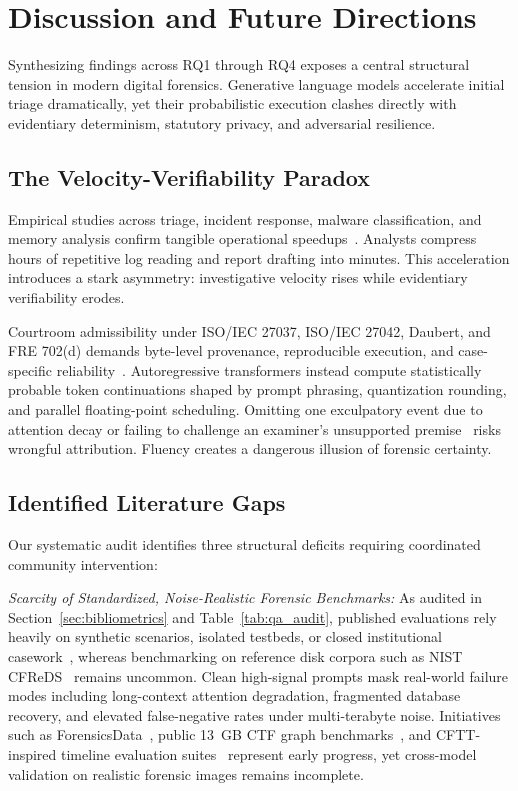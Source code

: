 \section{Discussion and Future Directions}
\label{sec:discussion}

Synthesizing findings across RQ1 through RQ4 exposes a central structural tension in modern digital forensics. Generative language models accelerate initial triage dramatically, yet their probabilistic execution clashes directly with evidentiary determinism, statutory privacy, and adversarial resilience.

\subsection{The Velocity-Verifiability Paradox}
Empirical studies across triage, incident response, malware classification, and memory analysis confirm tangible operational speedups~\cite{oh2024_volgpt, liu2025_autobnb, clark2025_large}. Analysts compress hours of repetitive log reading and report drafting into minutes. This acceleration introduces a stark asymmetry: investigative velocity rises while evidentiary verifiability erodes.

Courtroom admissibility under ISO/IEC 27037, ISO/IEC 27042, Daubert, and FRE 702(d) demands byte-level provenance, reproducible execution, and case-specific reliability~\cite{iso27037_2012, iso27042_2015, daubert1993, fre702_2023}. Autoregressive transformers instead compute statistically probable token continuations shaped by prompt phrasing, quantization rounding, and parallel floating-point scheduling. Omitting one exculpatory event due to attention decay or failing to challenge an examiner's unsupported premise~\cite{trivedi2026_when} risks wrongful attribution. Fluency creates a dangerous illusion of forensic certainty.

\subsection{Identified Literature Gaps}
Our systematic audit identifies three structural deficits requiring coordinated community intervention:

\textit{Scarcity of Standardized, Noise-Realistic Forensic Benchmarks:} As audited in Section~\ref{sec:bibliometrics} and Table~\ref{tab:qa_audit}, published evaluations rely heavily on synthetic scenarios, isolated testbeds, or closed institutional casework~\cite{jelodar2026_large, michelet2024_chatgpt, hammar2026_incident}, whereas benchmarking on reference disk corpora such as NIST CFReDS~\cite{nist_cfreds} remains uncommon. Clean high-signal prompts mask real-world failure modes including long-context attention degradation, fragmented database recovery, and elevated false-negative rates under multi-terabyte noise. Initiatives such as ForensicsData~\cite{chakir2025_forensicsdata}, public 13~GB CTF graph benchmarks~\cite{khatiwala2025_evaluating}, and CFTT-inspired timeline evaluation suites~\cite{studiawan2025_towards} represent early progress, yet cross-model validation on realistic forensic images remains incomplete.

